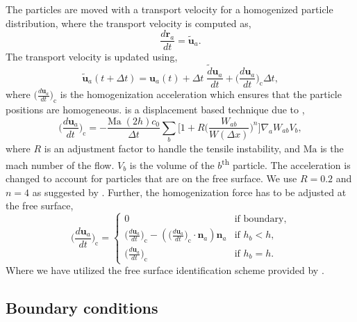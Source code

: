 \documentclass[preprint,12pt]{elsarticle}
\newcommand{\ten}[1]{\ensuremath{\mathbf{#1}}}
\begin{document}
The particles are moved with a transport velocity for a homogenized particle
distribution, where the transport velocity is computed as,
\begin{equation}
  \label{eq:transport_velocity_position_derivative}
  \frac{d\ten{r}_a}{dt} = \ten{\tilde{u}}_a.
\end{equation}
%
The transport velocity is updated using,
\begin{equation}
  \label{eq:transport_velocity}
  \ten{\tilde{u}}_a(t + \Delta t) =\ten{u}_a(t) + \Delta t \; \frac{\tilde{d} \ten{u}_a}{dt} +
  \bigg(\frac{d \ten{u}_{a}}{dt}\bigg)_{\text{c}} \Delta t,
\end{equation}
%
where $\big(\frac{d \ten{u}_a}{dt}\big)_{\text{c}}$ is the homogenization
acceleration which ensures that the particle positions are homogeneous.
is a displacement based technique due to \citet{sun2017deltaplus},
\begin{equation}
  \label{eq:sun2019_pst}
  \bigg(\frac{d \ten{u}_a}{dt}\bigg)_{\text{c}} = - \frac{\text{Ma} \;
    (2h) c_0}{\Delta t} \sum_b \bigg[1 + R \bigg( \frac{W_{ab}}{W(\Delta x)} \bigg)^n
  \bigg] \nabla_a W_{ab} V_b,
\end{equation}
where $R$ is an adjustment factor to handle the tensile instability, and
$\text{Ma}$ is the mach number of the flow. $V_b$ is the volume of the
$b$\textsuperscript{th} particle. The acceleration is changed to account for
particles that are on the free surface. We use $R = 0.2$ and $n = 4$ as
suggested by \citet{sun_consistent_2019}. Further, the homogenization force
has to be adjusted at the free surface,
\begin{equation}
 \label{eq:shifting_force_free_surface_adjust_sun2019}
 \bigg(\frac{d \ten{u}_a}{dt}\bigg)_{\text{c}} =\begin{cases}
   0& \text{if boundary},\\
   \big(\frac{d \ten{u}_a}{dt}\big)_{\text{c}}  - (\big(\frac{d \ten{u}_a}{dt}\big)_{\text{c}} \cdot \ten{n}_a) \ten{n}_a& \text{if $h_b < h$},\\
   \big(\frac{d \ten{u}_a}{dt}\big)_{\text{c}}& \text{if $h_b = h$}.
 \end{cases}
\end{equation}
Where we have utilized the free surface identification scheme provided by \cite{adepu2021corrected}.


\subsection{Boundary conditions}
\end{document}
